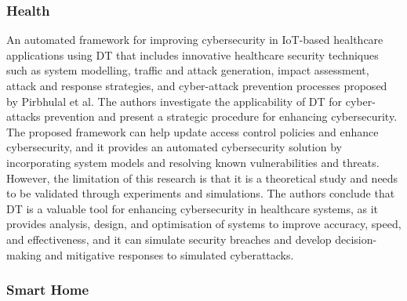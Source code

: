 \subsubsection*{Health}
An automated framework for improving cybersecurity in IoT-based healthcare applications using DT that includes innovative healthcare security techniques such as system modelling, traffic and attack generation, impact assessment, attack and response strategies, and cyber-attack prevention processes proposed by Pirbhulal et al.\cite{pirbhulalNovelFrameworkReinforcing2022} The authors investigate the applicability of DT for cyber-attacks prevention and present a strategic procedure for enhancing cybersecurity. The proposed framework can help update access control policies and enhance cybersecurity, and it provides an automated cybersecurity solution by incorporating system models and resolving known vulnerabilities and threats. However, the limitation of this research is that it is a theoretical study and needs to be validated through experiments and simulations. The authors conclude that DT is a valuable tool for enhancing cybersecurity in healthcare systems, as it provides analysis, design, and optimisation of systems to improve accuracy, speed, and effectiveness, and it can simulate security breaches and develop decision-making and mitigative responses to simulated cyberattacks. 

\subsubsection*{Smart Home}

